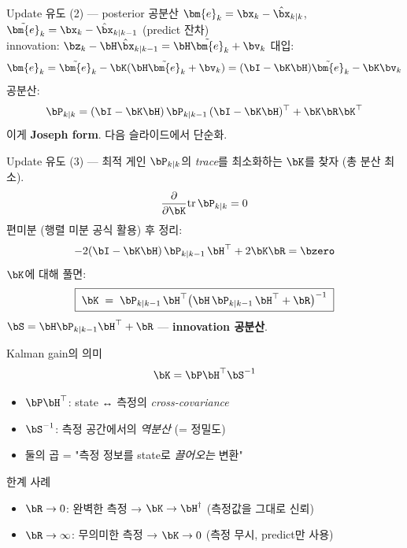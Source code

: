 \begin{frame}{Update 유도 (2) — posterior 공분산}
  \footnotesize
  $\bm{e}_k = \bx_k - \hat\bx_{k|k}$, $\tilde{\bm{e}}_k = \bx_k - \hat\bx_{k|k-1}$ (predict 잔차)\\
  innovation: $\bz_k - \bH\hat\bx_{k|k-1} = \bH\tilde{\bm{e}}_k + \bv_k$
  \pause
  \vspace{0.2em}
  대입:
  \[
    \bm{e}_k = \tilde{\bm{e}}_k - \bK(\bH\tilde{\bm{e}}_k + \bv_k) = (\bI - \bK\bH)\tilde{\bm{e}}_k - \bK\bv_k
  \]
  \pause
  \vspace{0.2em}
  공분산:
  \[
    \bP_{k|k} = (\bI-\bK\bH)\,\bP_{k|k-1}\,(\bI-\bK\bH)^\top + \bK \bR \bK^\top
  \]
  이게 \textbf{Joseph form}. 다음 슬라이드에서 단순화.
\end{frame}

\begin{frame}{Update 유도 (3) — 최적 게인}
  \footnotesize
  $\bP_{k|k}$의 \emph{trace}를 최소화하는 $\bK$를 찾자 (총 분산 최소).
  \[
    \frac{\partial}{\partial \bK} \mathrm{tr}\,\bP_{k|k} = 0
  \]
  \pause
  편미분 (행렬 미분 공식 활용) 후 정리:
  \[
    -2(\bI - \bK\bH)\,\bP_{k|k-1}\,\bH^\top + 2\bK\bR = \bzero
  \]
  \pause
  $\bK$에 대해 풀면:
  \[
    \boxed{\;\bK \;=\; \bP_{k|k-1}\,\bH^\top \bigl(\bH\,\bP_{k|k-1}\,\bH^\top + \bR\bigr)^{-1}\;}
  \]
  \vspace{0.3em}
  $\bS = \bH\bP_{k|k-1}\bH^\top + \bR$ — \textbf{innovation 공분산}.
\end{frame}

\begin{frame}{Kalman gain의 의미}
  \[
    \bK = \bP \bH^\top \bS^{-1}
  \]
  \begin{itemize}
    \item $\bP \bH^\top$: state ↔ 측정의 \emph{cross-covariance}
    \item $\bS^{-1}$: 측정 공간에서의 \emph{역분산} (= 정밀도)
    \item 둘의 곱 = "측정 정보를 state로 \emph{끌어오는} 변환"
  \end{itemize}
  \pause
  \vspace{0.4em}
  \begin{block}{한계 사례}
    \begin{itemize}
      \item $\bR \to 0$: 완벽한 측정 → $\bK \to \bH^\dagger$ (측정값을 그대로 신뢰)
      \item $\bR \to \infty$: 무의미한 측정 → $\bK \to 0$ (측정 무시, predict만 사용)
    \end{itemize}
  \end{block}
\end{frame}

